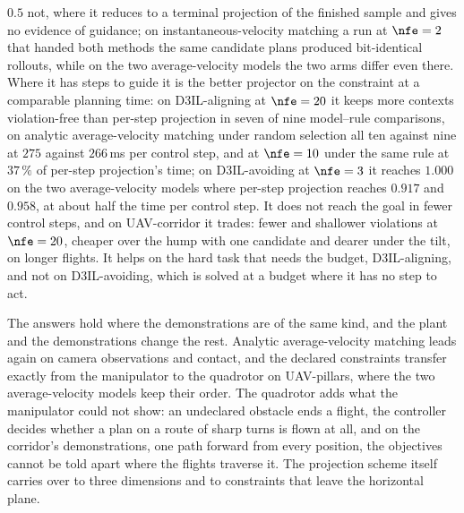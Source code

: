 \begin{description}
    $0.5$ not, where it reduces to a terminal projection of the finished sample and gives no evidence
    of guidance; on instantaneous-velocity matching a run at $\nfe = 2$ that handed both methods the
    same candidate plans produced bit-identical rollouts, while on the two average-velocity models the
    two arms differ even there. Where it has steps to guide it is the better projector on the
    constraint at a comparable planning time: on D3IL-aligning at $\nfe = 20$ it keeps more contexts
    violation-free than per-step projection in seven of nine model--rule comparisons, on analytic
    average-velocity matching under random selection all ten against nine at $275$ against
    $266$\,ms per control step, and at $\nfe = 10$ under the same rule at $37\,\%$ of per-step
    projection's time; on D3IL-avoiding at $\nfe = 3$ it reaches $1.000$ on the two average-velocity
    models where per-step projection reaches $0.917$ and $0.958$, at about half the time per control
    step. It does not reach the goal in fewer control steps, and on UAV-corridor it trades: fewer and
    shallower violations at $\nfe = 20$, cheaper over the hump with one candidate and dearer under
    the tilt, on longer flights. It helps on the hard task that needs the budget, D3IL-aligning, and
    not on D3IL-avoiding, which is solved at a budget where it has no step to act.
  \item[RQ3 --- Transfer.] The answers hold where the demonstrations are of the same kind, and the
    plant and the demonstrations change the rest. Analytic average-velocity matching leads again on
    camera observations and contact, and the declared constraints transfer exactly from the
    manipulator to the quadrotor on UAV-pillars, where the two average-velocity models keep their
    order. The quadrotor adds what the manipulator could not show: an undeclared obstacle ends a
    flight, the controller decides whether a plan on a route of sharp turns is flown at all, and on
    the corridor's demonstrations, one path forward from every position, the objectives cannot be
    told apart where the flights traverse it. The projection scheme itself carries over to three
    dimensions and to constraints that leave
    the horizontal plane.
\end{description}
